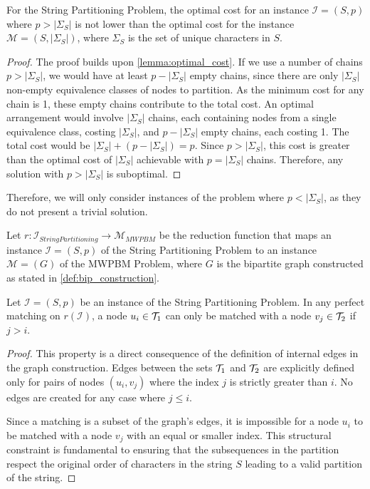 \begin{claim} \label{claim:p_greater_than_alphabet_size}
    For the String Partitioning Problem, the optimal cost for an instance $\mathcal{I}=(S, p)$ where $p > |\Sigma_S|$ is not lower than the optimal cost for the instance $\mathcal{M}=(S, |\Sigma_S|)$, where $\Sigma_S$ is the set of unique characters in $S$.
\end{claim}

\begin{proof}
    The proof builds upon \cref{lemma:optimal_cost}. If we use a number of chains $p > |\Sigma_S|$, we would have at least $p - |\Sigma_S|$ empty chains, since there are only $|\Sigma_S|$ non-empty equivalence classes of nodes to partition. As the minimum cost for any chain is 1, these empty chains contribute to the total cost. An optimal arrangement would involve $|\Sigma_S|$ chains, each containing nodes from a single equivalence class, costing $|\Sigma_S|$, and $p - |\Sigma_S|$ empty chains, each costing 1. The total cost would be $|\Sigma_S| + (p - |\Sigma_S|) = p$. Since $p > |\Sigma_S|$, this cost is greater than the optimal cost of $|\Sigma_S|$ achievable with $p = |\Sigma_S|$ chains. Therefore, any solution with $p > |\Sigma_S|$ is suboptimal.
\end{proof}

Therefore, we will only consider instances of the problem where $p < |\Sigma_S|$, as they do not present a trivial solution.

Let $r:\mathcal{I}_{String Partitioning} \rightarrow \mathcal{M}_{MWPBM}$ be the reduction function that maps an instance $\mathcal{I}=(S, p)$ of the String Partitioning Problem to an instance $\mathcal{M}=(G)$ of the MWPBM Problem, where $G$ is the bipartite graph constructed as stated in \cref{def:bip_construction}.
\begin{claim} \label{lemma:greater_nodes}
    Let $\mathcal{I}=(S, p)$ be an instance of the String Partitioning Problem. In any perfect matching on $r(\mathcal{I})$, a node $u_i \in \mathcal{T}_{1}$ can only be matched with a node $v_j \in \mathcal{T}_{2}$ if $j > i$.
\end{claim}

\begin{proof}
    This property is a direct consequence of the definition of internal edges in the graph construction. Edges between the sets $\mathcal{T}_{1}$ and $\mathcal{T}_{2}$ are explicitly defined only for pairs of nodes $(u_i, v_j)$ where the index $j$ is strictly greater than $i$. No edges are created for any case where $j \le i$.

    Since a matching is a subset of the graph's edges, it is impossible for a node $u_i$ to be matched with a node $v_j$ with an equal or smaller index. This structural constraint is fundamental to ensuring that the subsequences in the partition respect the original order of characters in the string $S$ leading to a valid partition of the string.
\end{proof}

